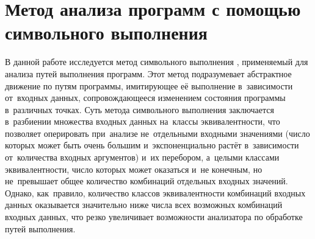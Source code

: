 \section{Метод анализа программ с помощью символьного выполнения} \label{sect1_1}
В данной работе исследуется метод символьного выполнения \cite{king76}, применяемый для анализа путей выполнения программ. Этот метод подразумевает абстрактное движение по путям программы, имитирующее её выполнение в~зависимости от~входных данных, сопровождающееся изменением состояния программы в~различных точках. Суть метода символьного выполнения заключается в~разбиении множества входных данных на~классы эквивалентности, что позволяет оперировать при~анализе не~отдельными входными значениями (число которых может быть очень большим и~экспоненциально растёт в~зависимости от~количества входных аргументов) и~их перебором, а~целыми классами эквивалентности, число которых может оказаться и~не конечным, но не~превышает общее количество комбинаций отдельных входных значений. Однако, как~правило, количество классов эквивалентности комбинаций входных данных оказывается значительно ниже числа всех возможных комбинаций входных данных, что резко увеличивает возможности анализатора по обработке путей выполнения.

